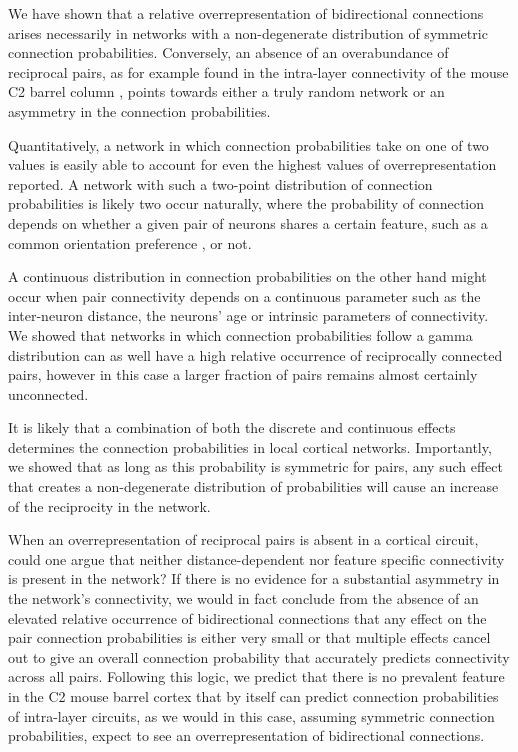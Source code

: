 
We have shown that a relative overrepresentation of bidirectional connections arises necessarily in networks with a non-degenerate distribution of symmetric connection probabilities. Conversely, an absence of an overabundance of reciprocal pairs, as for example found in the intra-layer connectivity of the mouse C2 barrel column \cite{Lefort2009}, points towards either a truly random network or an asymmetry in the connection probabilities. 

Quantitatively, a network in which connection probabilities take on one of two values is easily able to account for even the highest values of overrepresentation reported. A network with such a two-point distribution of connection probabilities is likely two occur naturally, where the probability of connection depends on whether a given pair of neurons shares a certain feature, such as a common orientation preference \cite{Lee2016}, or not. 

A continuous distribution in connection probabilities on the other hand might occur when pair connectivity depends on a continuous parameter such as the inter-neuron distance, the neurons' age or intrinsic parameters of connectivity. We showed that networks in which connection probabilities follow a gamma distribution can as well have a high relative occurrence of reciprocally connected pairs, however in this case a larger fraction of pairs remains almost certainly unconnected.

It is likely that a combination of both the discrete and continuous effects determines the connection probabilities in local cortical networks. Importantly, we showed that as long as this probability is symmetric for pairs, any such effect that creates a non-degenerate distribution of probabilities will cause an increase of the reciprocity in the network.

When an overrepresentation of reciprocal pairs is absent in a cortical circuit, could one argue that neither distance-dependent nor feature specific connectivity is present in the network? If there is no evidence for a substantial asymmetry in the network's connectivity, we would in fact conclude from the absence of an elevated relative occurrence of bidirectional connections that any effect on the pair connection probabilities is either very small or that multiple effects cancel out to give an overall connection probability that accurately predicts connectivity across all pairs. Following this logic, we predict that there is no prevalent feature in the C2 mouse barrel cortex that by itself can predict connection probabilities of intra-layer circuits, as we would in this case, assuming symmetric connection probabilities, expect to see an overrepresentation of bidirectional connections.

